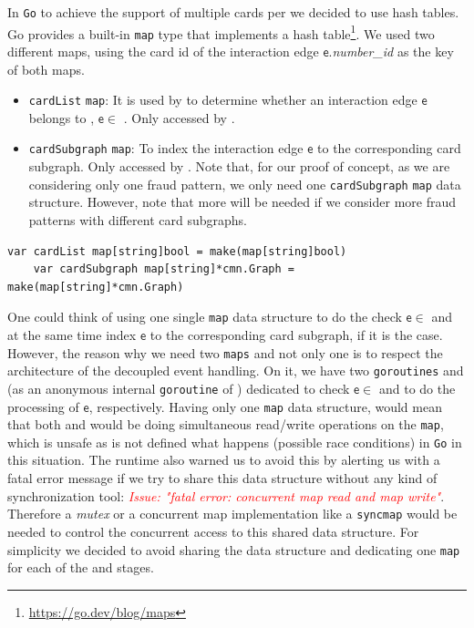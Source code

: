 \begin{itemize}
    In \texttt{Go} to achieve the support of multiple cards per \filter we decided to use hash tables. Go provides a built-in \texttt{map} type that implements a hash table\footnote{\url{https://go.dev/blog/maps}}. We used two different maps, using the card id of the interaction edge $\mathsf{e}$.\emph{number\_id} as the key of both maps.

    \begin{itemize}
        \item \texttt{cardList} \texttt{map}: It is used by \F to determine whether an interaction edge $\mathsf{e}$ belongs to \F, $\mathsf{e} \in$ \F. Only accessed by \F.
        \item \texttt{cardSubgraph} \texttt{map}: To index the interaction edge $\mathsf{e}$ to the corresponding card subgraph.
        Only accessed by \FW. Note that, for our proof of concept, as we are considering only one fraud pattern, we only need one \texttt{cardSubgraph} \texttt{map} data structure. However, note that more will be needed if we consider more fraud patterns with different card subgraphs.
    \end{itemize}

    \begin{center}
    \lstset{style=golangStyle}
    \begin{lstlisting}[caption={Hash Tables \texttt{map} Data Structures on a \emph{Filter} \F stage}]
    var cardList map[string]bool = make(map[string]bool)
    var cardSubgraph map[string]*cmn.Graph = make(map[string]*cmn.Graph)
    \end{lstlisting}
    \end{center}

    One could think of using one single \texttt{map} data structure to do the check $\mathsf{e} \in$ \F and at the same time index $\mathsf{e}$ to the corresponding card subgraph, if it is the case. However, the reason why we need two \texttt{maps} and not only one is to respect the architecture of the decoupled event handling. On it, we have two \texttt{goroutines} \F and \FW (as an anonymous internal \texttt{goroutine} of \F) dedicated to check $\mathsf{e} \in$ \F and to do the processing of $\mathsf{e}$, respectively. Having only one \texttt{map} data structure, would mean that both \F and \FW would be doing simultaneous read/write operations on the \texttt{map}, which is unsafe as is not defined what happens (possible race conditions) in \texttt{Go} in this situation. The runtime also warned us to avoid this by alerting us with a fatal error message if we try to share this data structure without any kind of synchronization tool: \textit{\textcolor{red}{Issue: "fatal error: concurrent map read and map write"}}. Therefore a \textit{mutex} or a concurrent map implementation like a \texttt{syncmap} would be needed to control the concurrent access to this shared data structure. For simplicity we decided to avoid sharing the data structure and dedicating one \texttt{map} for each of the \F and \FW stages.


\end{itemize}
